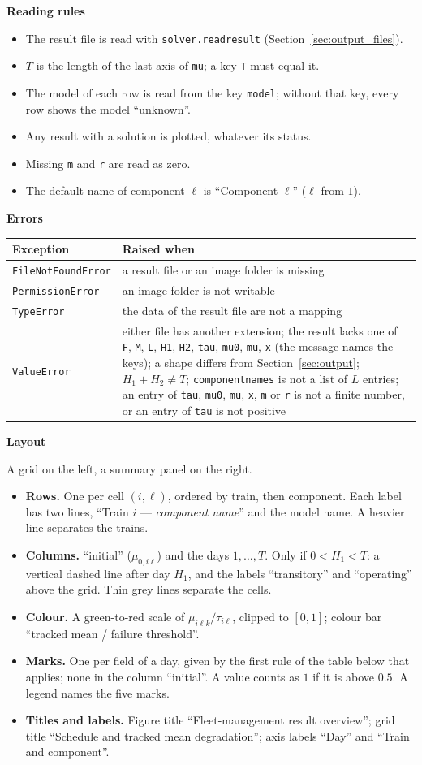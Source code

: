 \documentclass[11pt,a4paper]{article}
\makeatletter
\theoremstyle{plain}
\theoremstyle{definition}
\newcommand{\blockhead}[1]{\par\noindent\textbf{#1}\par\nobreak}
\renewcommand{\_}{\textunderscore\allowbreak{}}
\providecommand{\rejrow}[2]{{\raggedright #1\par} & {\raggedright #2\par} \\}
\providecommand{\tabstart}[2]{\begingroup\small\begin{longtable}{@{}#1@{}}\toprule #2 \\ \midrule \endhead}
\providecommand{\tabend}{\bottomrule\end{longtable}\endgroup}
\makeatother
\begin{document}
\blockhead{Reading rules}
\begin{itemize}[nosep]
  \item The result file is read with \texttt{solver.read\_result} (Section~\ref{sec:output_files}).
  \item $T$ is the length of the last axis of \texttt{mu}; a key \texttt{T} must equal it.
  \item The model of each row is read from the key \texttt{model}; without that key, every row shows the model ``unknown''.
  \item Any result with a solution is plotted, whatever its status.
  \item Missing \texttt{m} and \texttt{r} are read as zero.
  \item The default name of component $\ell$ is ``Component $\ell$'' ($\ell$ from $1$).
\end{itemize}

\blockhead{Errors}
\tabstart{p{3.4cm}p{11.6cm}}{Exception & Raised when}
\rejrow{\texttt{FileNotFoundError}}{a result file or an image folder is missing}
\rejrow{\texttt{PermissionError}}{an image folder is not writable}
\rejrow{\texttt{TypeError}}{the data of the result file are not a mapping}
\rejrow{\texttt{ValueError}}{either file has another extension; the result lacks one of \texttt{F}, \texttt{M}, \texttt{L}, \texttt{H1}, \texttt{H2}, \texttt{tau}, \texttt{mu\_0}, \texttt{mu}, \texttt{x} (the message names the keys); a shape differs from Section~\ref{sec:output}; $H_1 + H_2 \neq T$; \texttt{component\_names} is not a list of $L$ entries; an entry of \texttt{tau}, \texttt{mu\_0}, \texttt{mu}, \texttt{x}, \texttt{m} or \texttt{r} is not a finite number, or an entry of \texttt{tau} is not positive}
\tabend

\blockhead{Layout}
A grid on the left, a summary panel on the right.
\begin{itemize}[nosep]
  \item \textbf{Rows.} One per cell $(i,\ell)$, ordered by train, then component. Each label has two lines, ``Train $i$ --- \emph{component name}'' and the model name. A heavier line separates the trains.
  \item \textbf{Columns.} ``initial'' ($\mu_{0,i\ell}$) and the days $1,\ldots,T$. Only if $0 < H_1 < T$: a vertical dashed line after day $H_1$, and the labels ``transitory'' and ``operating'' above the grid. Thin grey lines separate the cells.
  \item \textbf{Colour.} A green-to-red scale of $\mu_{i\ell k}/\tau_{i\ell}$, clipped to $[0,1]$; colour bar ``tracked mean / failure threshold''.
  \item \textbf{Marks.} One per field of a day, given by the first rule of the table below that applies; none in the column ``initial''. A value counts as $1$ if it is above $0.5$. A legend names the five marks.
  \item \textbf{Titles and labels.} Figure title ``Fleet-management result overview''; grid title ``Schedule and tracked mean degradation''; axis labels ``Day'' and ``Train and component''.
\end{itemize}
\end{document}
